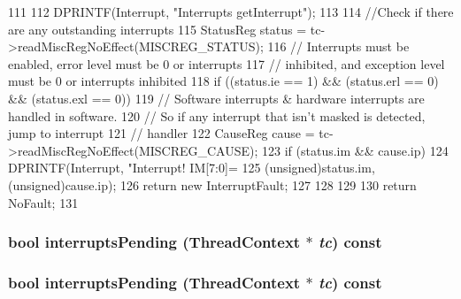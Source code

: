 \begin{DoxyCode}
111 {
112     DPRINTF(Interrupt, "Interrupts getInterrupt\n");
113 
114     //Check if there are any outstanding interrupts
115     StatusReg status = tc->readMiscRegNoEffect(MISCREG_STATUS);
116     // Interrupts must be enabled, error level must be 0 or interrupts
117     // inhibited, and exception level must be 0 or interrupts inhibited
118     if ((status.ie == 1) && (status.erl == 0) && (status.exl == 0)) {
119         // Software interrupts & hardware interrupts are handled in software.
120         // So if any interrupt that isn't masked is detected, jump to interrupt
121         // handler
122         CauseReg cause = tc->readMiscRegNoEffect(MISCREG_CAUSE);
123         if (status.im && cause.ip) {
124             DPRINTF(Interrupt, "Interrupt! IM[7:0]=%
125                     (unsigned)status.im, (unsigned)cause.ip);
126             return new InterruptFault;
127         }
128     }
129 
130     return NoFault;
131 }
\end{DoxyCode}
\hypertarget{classMipsISA_1_1Interrupts_a79de56931b0c5eff3edb7585b2b14286}{
\subsubsection[{interruptsPending}]{\setlength{\rightskip}{0pt plus 5cm}bool interruptsPending ({\bf ThreadContext} $\ast$ {\em tc}) const}}
\label{classMipsISA_1_1Interrupts_a79de56931b0c5eff3edb7585b2b14286}
\hypertarget{classMipsISA_1_1Interrupts_a79de56931b0c5eff3edb7585b2b14286}{
\subsubsection[{interruptsPending}]{\setlength{\rightskip}{0pt plus 5cm}bool interruptsPending ({\bf ThreadContext} $\ast$ {\em tc}) const}}
\label{classMipsISA_1_1Interrupts_a79de56931b0c5eff3edb7585b2b14286}



